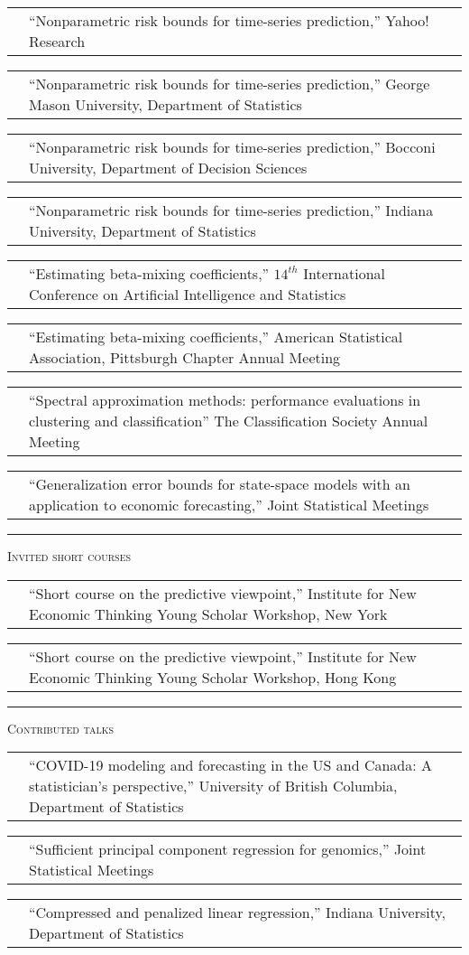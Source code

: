 \documentclass[11pt,letterpaper]{minimal/moderncv}
\makeatletter
\renewcommand{\section}[1]{  \par\addvspace{15pt}%
  \parbox[t]{\hintscolumnwidth}{\strut\raggedleft\raisebox{4pt}%
  {\rule{\hintscolumnwidth}{2pt}}}%
  \hspace{\separatorcolumnwidth}%
  \textsc{\Large #1}\par\nobreak\addvspace{6pt}%
}
\renewcommand*{\cvitem}[2]{%
  \begin{tabular}{@{}p{\hintscolumnwidth}@{\hspace{\separatorcolumnwidth}}%
    p{\maincolumnwidth}@{}}%
    \raggedleft {#1} &  {#2}%
  \end{tabular}%
}
\makeatother
\begin{document}
\cvitem{2012}{``Nonparametric risk bounds for time-series
  prediction,'' Yahoo! Research} 

\cvitem{}{``Nonparametric risk bounds for time-series prediction,'' George
  Mason University, Department of Statistics}

\cvitem{}{``Nonparametric risk bounds for time-series prediction,''
  Bocconi University, Department of Decision Sciences}

\cvitem{}{``Nonparametric risk bounds for time-series prediction,''
  Indiana University, Department of Statistics}

\cvitem{}{``Estimating beta-mixing coefficients,'' $14^{th}$
  International Conference on Artificial Intelligence and Statistics}

\cvitem{}{``Estimating beta-mixing coefficients,'' American Statistical
  Association, Pittsburgh Chapter Annual Meeting} 

\cvitem{}{``Spectral approximation methods: performance evaluations in
  clustering and classification'' The Classification Society Annual Meeting}

\cvitem{2010}{``Generalization error bounds for state-space models with an
  application to economic forecasting,''
  Joint Statistical Meetings}

\section{Invited short courses}

\cvitem{2015}{``Short course on the predictive viewpoint,''
  Institute for New Economic Thinking Young Scholar Workshop,
  New York}

\cvitem{2013}{``Short course on the predictive viewpoint,'' Institute for New
  Economic Thinking Young Scholar Workshop, 
  Hong Kong}
    
    
    
\section{Contributed talks}

\cvitem{2021}{``COVID-19 modeling and forecasting in the US and Canada:
  A statistician's perspective,'' University of British Columbia,
  Department of Statistics}

\cvitem{2019}{``Sufficient principal component regression for
  genomics,'' Joint Statistical Meetings}

\cvitem{2017}{ ``Compressed and penalized linear regression,'' Indiana
  University, Department of Statistics}
\end{document}
